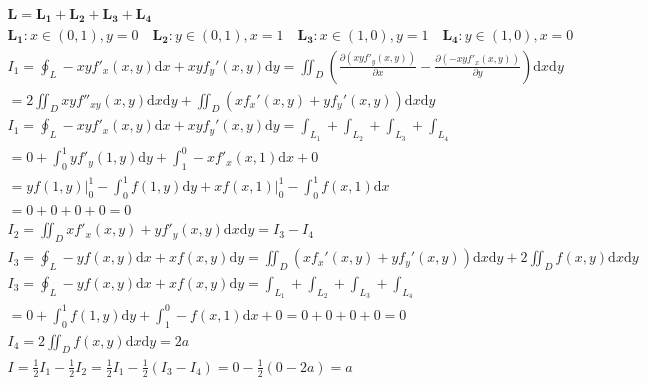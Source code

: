 \documentclass{article}
\begin{document}
\clearpage
\begin{align*}
    \mathbf{L} = \mathbf{L_{1}} + \mathbf{L_{2}} + \mathbf{L_{3}} + \mathbf{L_{4}} \\
    \mathbf{L_{1}} : x \in(0,1),y=0 \quad \mathbf{L_{2}} : y \in(0,1),x=1 \quad \mathbf{L_{3}} : x \in(1,0),y=1 \quad \mathbf{L_{4}} :  y \in(1,0),x = 0 \\
    I_{1} = \oint_{L}-xyf'_{x}(x,y)\mathrm{d}x + xyf_{y}'(x,y)\mathrm{d}y = \iint_{D}\left(\frac{\partial\left({xyf'_{y}(x,y)}\right) }{\partial x}-\frac{\partial\left(-{xyf'_{x}(x,y)}\right) }{\partial y}\right) \mathrm{d}x\mathrm{d}y \\ 
    = 2\iint_{D}xyf''_{xy}(x,y)\mathrm{d}x\mathrm{d}y+\iint_{D}\left(xf_{x}'(x,y)+yf_{y}'(x,y)\right)\mathrm{d}x\mathrm{d}y\\ 
    I_{1} = \oint_{L}-xyf'_{x}(x,y)\mathrm{d}x + xyf_{y}'(x,y)\mathrm{d}y = \int_{L_{1}}+\int_{L_{2}}+\int_{L_{3}}+\int_{L_{4}} \\
    = 0 + \int_{0}^{1}yf'_{y}(1,y)\mathrm{d}y+\int_{1}^{0}-xf'_{x}(x,1)\mathrm{d}x+0 \\ = \left. yf(1,y) \right|_{0}^{1}-\int_{0}^{1}f(1,y)\mathrm{d}y+\left. xf(x,1) \right|_{0}^{1}-\int_{0}^{1}f(x,1)\mathrm{d}x
    \\ = 0+0+0+0=0 \\
    I_{2} = \iint_{D}{xf'_{x}(x,y)+yf'_{y}(x,y)}\mathrm{d}x\mathrm{d}y=I_{3}-I_{4} \\  
    I_{3} = \oint_{L} -yf(x,y)\mathrm{d}x+xf(x,y)\mathrm{d}y = \iint_{D}\left(xf_{x}'(x,y)+yf_{y}'(x,y)\right)\mathrm{d}x\mathrm{d}y + 2\iint_{D}f(x,y)\mathrm{d}x\mathrm{d}y\\ 
    I_{3} = \oint_{L} -yf(x,y)\mathrm{d}x+xf(x,y)\mathrm{d}y = \int_{L_{1}}+\int_{L_{2}}+\int_{L_{3}}+\int_{L_{4}} \\
    = 0+\int_{0}^{1}f(1,y)\mathrm{d}y+\int_{1}^{0}-f(x,1)\mathrm{d}x+0 = 0+0+0+0=0 \\  
    I_{4} = 2\iint_{D}f(x,y)\mathrm{d}x\mathrm{d}y=2a\\
    I=\frac{1}{2}I_{1}-\frac{1}{2}I_{2} = \frac{1}{2}I_{1}-\frac{1}{2}(I_{3}-I_{4}) = 0-\frac{1}{2}(0-2a) = a \\   
\end{align*}
\end{document}
